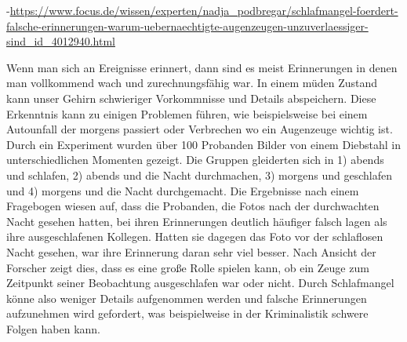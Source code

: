 -\url{https://www.focus.de/wissen/experten/nadja_podbregar/schlafmangel-foerdert-falsche-erinnerungen-warum-uebernaechtigte-augenzeugen-unzuverlaessiger-sind_id_4012940.html}

Wenn man sich an Ereignisse erinnert, dann sind es meist Erinnerungen in denen man vollkommend wach und zurechnungsfähig war. In einem müden Zustand kann unser Gehirn schwieriger Vorkommnisse und Details abspeichern. Diese Erkenntnis kann zu einigen Problemen führen, wie beispielsweise bei einem Autounfall der morgens passiert oder Verbrechen wo ein Augenzeuge wichtig ist. Durch ein Experiment wurden über 100 Probanden Bilder von einem Diebstahl in unterschiedlichen Momenten gezeigt. Die Gruppen gleiderten sich in 1) abends und schlafen, 2) abends und die Nacht durchmachen, 3) morgens und geschlafen und 4) morgens und die Nacht durchgemacht. Die Ergebnisse nach einem Fragebogen wiesen auf, dass die Probanden, die Fotos nach der durchwachten Nacht gesehen hatten, bei ihren Erinnerungen deutlich häufiger falsch lagen als ihre ausgeschlafenen Kollegen. Hatten sie dagegen das Foto vor der schlaflosen Nacht gesehen, war ihre Erinnerung daran sehr viel besser. Nach Ansicht der Forscher zeigt dies, dass es eine große Rolle spielen kann, ob ein Zeuge zum Zeitpunkt seiner Beobachtung ausgeschlafen war oder nicht. Durch Schlafmangel könne also weniger Details aufgenommen werden und falsche Erinnerungen aufzunehmen wird gefordert, was beispielweise in der Kriminalistik schwere Folgen haben kann.\\